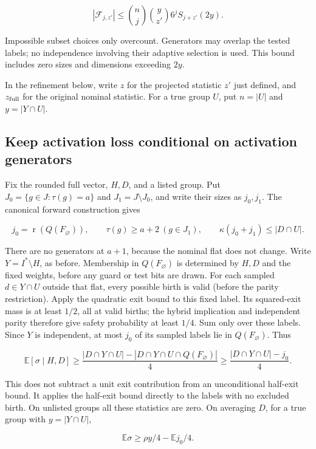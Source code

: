 \documentclass[11pt]{article}
\begin{document}
\[|\mathcal F_{j,z'}|\le
\binom nj\binom y{z'}6^jS_{j+z'}(2y).\]

Impossible subset choices only overcount. Generators may overlap the tested labels; no independence involving their adaptive selection is used. This bound includes zero sizes and dimensions exceeding \(2y\).

In the refinement below, write \(z\) for the projected statistic \(z'\) just defined, and \(z_{\rm full}\) for the original nominal statistic. For a true group \(U\), put \(n=|U|\) and \(y=|Y\cap U|\).

\subsection{Keep activation loss conditional on activation generators}\label{keep-activation-loss-conditional-on-activation-generators}

Fix the rounded full vector, \(H,D\), and a listed group. Put \(J_0=\{g\in J:\tau(g)=a\}\) and \(J_1=J\setminus J_0\), and write their sizes as \(j_0,j_1\). The canonical forward construction gives

\[j_0=\operatorname{r}(Q(F_{\varnothing})),\qquad
\tau(g)\ge a+2\ (g\in J_1),\qquad
\kappa(j_0+j_1)\le |D\cap U|.\]

There are no generators at \(a+1\), because the nominal flat does not change. Write \(Y=I^*\setminus H\), as before. Membership in \(Q(F_{\varnothing})\) is determined by \(H,D\) and the fixed weights, before any guard or test bits are drawn. For each sampled \(d\in Y\cap U\) outside that flat, every possible birth is valid (before the parity restriction). Apply the quadratic exit bound to this fixed label. Its squared-exit mass is at least \(1/2\), all at valid births; the hybrid implication and independent parity therefore give safety probability at least \(1/4\). Sum only over these labels. Since \(Y\) is independent, at most \(j_0\) of its sampled labels lie in \(Q(F_{\varnothing})\). Thus

\[\mathbb E[\sigma\mid H,D]
\ge\frac{|D\cap Y\cap U|-|D\cap Y\cap U\cap Q(F_{\varnothing})|}{4}
\ge\frac{|D\cap Y\cap U|-j_0}{4}.\]

This does not subtract a unit exit contribution from an unconditional half-exit bound. It applies the half-exit bound directly to the labels with no excluded birth. On unlisted groups all these statistics are zero. On averaging \(D\), for a true group with \(y=|Y\cap U|\),

\[\mathbb E\sigma\ge \rho y/4-\mathbb E j_0/4.\]
\end{document}
